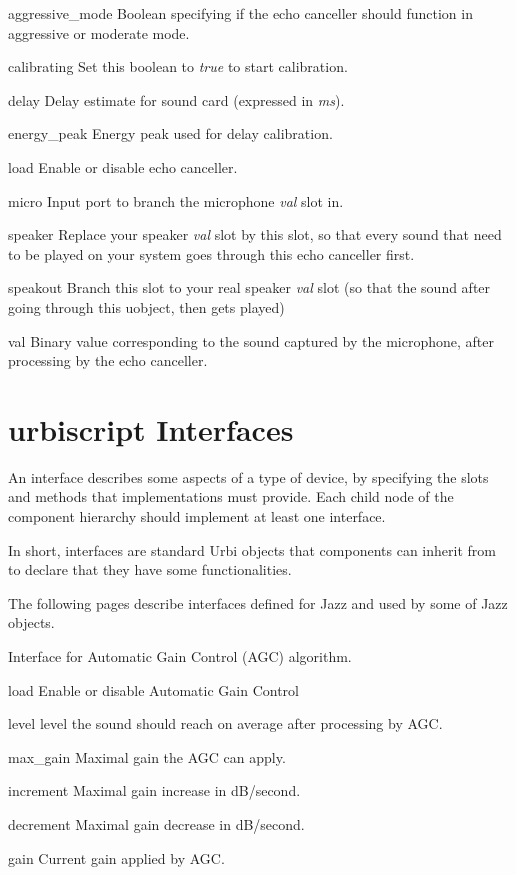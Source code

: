 \begin{urbiscriptapi}
\item[aggressive_mode] Boolean specifying if the echo canceller should
  function in aggressive or moderate mode.
\item[calibrating] Set this boolean to \textit{true} to start  calibration.
\item[delay] Delay estimate for sound card (expressed in \textit{ms}).
\item[energy_peak] Energy peak used for delay calibration.
\item[load] Enable or disable echo canceller.
\item[micro] Input port to branch the microphone \textit{val} slot in.
\item[speaker] Replace your speaker \textit{val} slot by this slot, so that
  every sound that need to be played on your system goes through this echo
  canceller first.
\item[speakout] Branch this slot to your real speaker \textit{val} slot (so that the sound after going through this uobject, then gets played)
\item[val] Binary value corresponding to the sound captured by the
  microphone, after processing by the echo canceller.
\end{urbiscriptapi}


\chapter{urbiscript Interfaces}

An interface describes some aspects of a type of device, by specifying the
slots and methods that implementations must provide. Each child node of the
component hierarchy should implement at least one interface.

In short, interfaces are standard Urbi objects that components can inherit
from to declare that they have some functionalities.

The following pages describe interfaces defined for Jazz and used by some of
Jazz objects.


Interface for Automatic Gain Control (AGC) algorithm.

\begin{urbiscriptapi}
\item[load] Enable or disable Automatic Gain Control
\item[level] level the sound should reach on average after processing by AGC.
\item[max_gain] Maximal gain the AGC can apply.
\item[increment] Maximal gain increase in dB/second.
\item[decrement] Maximal gain decrease in dB/second.
\item[gain] Current gain applied by AGC.
\end{urbiscriptapi}

